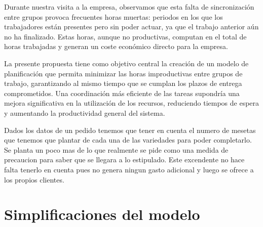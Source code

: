 Durante nuestra visita a la empresa, observamos que esta falta de sincronización entre grupos provoca frecuentes horas muertas: periodos en los que los trabajadores están presentes pero sin poder actuar,
ya que el trabajo anterior aún no ha finalizado. Estas horas, aunque no productivas, computan en el total de horas trabajadas y generan un coste económico directo para la empresa.

La presente propuesta tiene como objetivo central la creación de un modelo de planificación que permita minimizar las horas improductivas entre grupos de trabajo,
garantizando al mismo tiempo que se cumplan los plazos de entrega comprometidos. Una coordinación más eficiente de las tareas supondría una mejora significativa en la utilización de los recursos,
reduciendo tiempos de espera y aumentando la productividad general del sistema.

Dados los datos de un pedido tenemos que tener en cuenta el numero de mesetas que tenemos que plantar de cada una de las variedades para 
poder completarlo. Se planta un poco mas de lo que realmente se pide como una medida de precaucion para saber que se llegara a lo estipulado. 
Este excendente no hace falta tenerlo en cuenta pues no genera ningun gasto adicional y luego se ofrece a los propios clientes.  

\section*{Simplificaciones del modelo}

